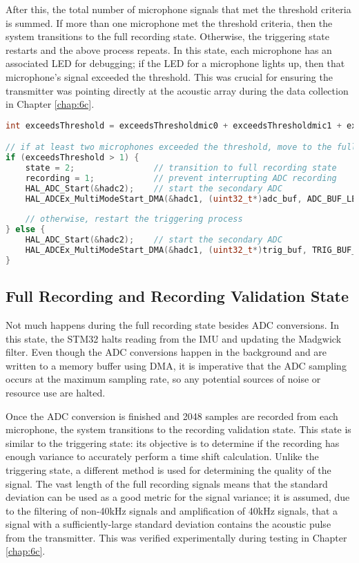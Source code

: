 \documentclass[12pt,a4paper]{report}
\begin{document}
After this, the total number of microphone signals that met the threshold criteria is summed. If more than one microphone met the threshold criteria, then the system transitions to the full recording state. Otherwise, the triggering state restarts and the above process repeats. In this state, each microphone has an associated LED for debugging; if the LED for a microphone lights up, then that microphone’s signal exceeded the threshold. This was crucial for ensuring the transmitter was pointing directly at the acoustic array during the data collection in Chapter \ref{chap:6c}.

\begin{lstlisting}[language=C++]
int exceedsThreshold = exceedsThresholdmic0 + exceedsThresholdmic1 + exceedsThresholdmic2 + exceedsThresholdmic3;

// if at least two microphones exceeded the threshold, move to the full recording state
if (exceedsThreshold > 1) {
	state = 2;                // transition to full recording state
	recording = 1;            // prevent interrupting ADC recording
	HAL_ADC_Start(&hadc2);    // start the secondary ADC
	HAL_ADCEx_MultiModeStart_DMA(&hadc1, (uint32_t*)adc_buf, ADC_BUF_LEN * NUM_MIC / 2); // start the primary ADC in DMA mode
	
	// otherwise, restart the triggering process
} else {
	HAL_ADC_Start(&hadc2);    // start the secondary ADC
	HAL_ADCEx_MultiModeStart_DMA(&hadc1, (uint32_t*)trig_buf, TRIG_BUF_LEN * NUM_MIC / 2); // start the primary ADC in DMA mode
}
\end{lstlisting}

\subsection{Full Recording and Recording Validation State} \label{ssec:3s7s4}
Not much happens during the full recording state besides ADC conversions. In this state, the STM32 halts reading from the IMU and updating the Madgwick filter. Even though the ADC conversions happen in the background and are written to a memory buffer using DMA, it is imperative that the ADC sampling occurs at the maximum sampling rate, so any potential sources of noise or resource use are halted.

Once the ADC conversion is finished and 2048 samples are recorded from each microphone, the system transitions to the recording validation state. This state is similar to the triggering state: its objective is to determine if the recording has enough variance to accurately perform a time shift calculation. Unlike the triggering state, a different method is used for determining the quality of the signal. The vast length of the full recording signals means that the standard deviation can be used as a good metric for the signal variance; it is assumed, due to the filtering of non-40kHz signals and amplification of 40kHz signals, that a signal with a sufficiently-large standard deviation contains the acoustic pulse from the transmitter. This was verified experimentally during testing in Chapter \ref{chap:6c}.
\end{document}
